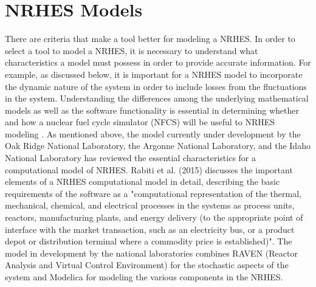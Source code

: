 \documentclass[12pt]{UIdahoMastersThesis}
\begin{document}
\section{NRHES Models}
There are criteria that make a tool better for modeling a NRHES. In order to select a tool to model a NRHES, it is necessary to understand what characteristics a model must possess in order to provide accurate information. For example, as discussed below, it is important for a NRHES model to incorporate the dynamic nature of the system in order to include losses from the fluctuations in the system. Understanding the differences among the underlying mathematical models as well as the software functionality is essential in determining whether and how a nuclear fuel cycle simulator (NFCS) will be useful to NRHES modeling . 
As mentioned above, the model currently under development by the Oak Ridge National Laboratory, the Argonne National Laboratory, and the Idaho National Laboratory has reviewed the essential characteristics for a computational model of NRHES. Rabiti et al. (2015) discusses the important elements of a NRHES computational model in detail, describing the basic requirements of the software as a "computational representation of the thermal, mechanical, chemical, and electrical processes in the systems as process units, reactors, manufacturing plants, and energy delivery (to the appropriate point of interface with the market transaction, such as an electricity bus, or a product depot or distribution terminal where a commodity price is established)"\cite{Rabiti2015}. The model in development by the national laboratories combines RAVEN (Reactor Analysis and Virtual Control Environment) for the stochastic aspects of the system and Modelica for modeling the various components in the NRHES. 
\end{document}
